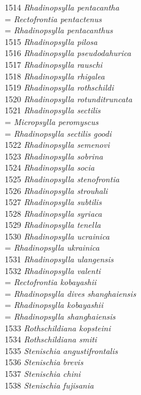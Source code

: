 \documentclass[
]{article}
\begin{document}
1514 \emph{Rhadinopsylla pentacantha}\\
= \emph{Rectofrontia pentactenus}\\
= \emph{Rhadinopsylla pentacanthus}\\
1515 \emph{Rhadinopsylla pilosa}\\
1516 \emph{Rhadinopsylla pseudodahurica}\\
1517 \emph{Rhadinopsylla rauschi}\\
1518 \emph{Rhadinopsylla rhigalea}\\
1519 \emph{Rhadinopsylla rothschildi}\\
1520 \emph{Rhadinopsylla rotunditruncata}\\
1521 \emph{Rhadinopsylla sectilis}\\
= \emph{Micropsylla peromyscus}\\
= \emph{Rhadinopsylla sectilis goodi}\\
1522 \emph{Rhadinopsylla semenovi}\\
1523 \emph{Rhadinopsylla sobrina}\\
1524 \emph{Rhadinopsylla socia}\\
1525 \emph{Rhadinopsylla stenofrontia}\\
1526 \emph{Rhadinopsylla strouhali}\\
1527 \emph{Rhadinopsylla subtilis}\\
1528 \emph{Rhadinopsylla syriaca}\\
1529 \emph{Rhadinopsylla tenella}\\
1530 \emph{Rhadinopsylla ucrainica}\\
= \emph{Rhadinopsylla ukrainica}\\
1531 \emph{Rhadinopsylla ulangensis}\\
1532 \emph{Rhadinopsylla valenti}\\
= \emph{Rectofrontia kobayashii}\\
= \emph{Rhadinopsylla dives shanghaiensis}\\
= \emph{Rhadinopsylla kobayashii}\\
= \emph{Rhadinopsylla shanghaiensis}\\
1533 \emph{Rothschildiana kopsteini}\\
1534 \emph{Rothschildiana smiti}\\
1535 \emph{Stenischia angustifrontalis}\\
1536 \emph{Stenischia brevis}\\
1537 \emph{Stenischia chini}\\
1538 \emph{Stenischia fujisania}\\
\end{document}
